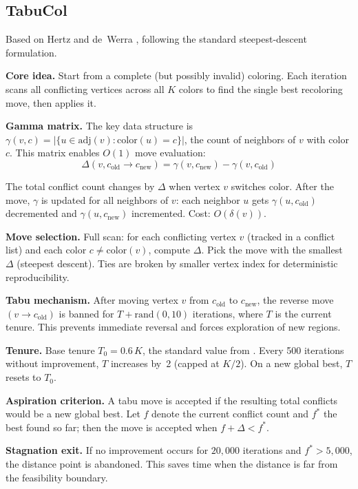 \documentclass[11pt,a4paper]{article}
\begin{document}
\subsection{TabuCol}

Based on Hertz and de~Werra \cite{hertz1987}, following the standard
steepest-descent formulation.

\textbf{Core idea.} Start from a complete (but possibly invalid) coloring. Each iteration
scans all conflicting vertices across all $K$ colors to find the single best recoloring
move, then applies it.

\textbf{Gamma matrix.} The key data structure is
$\gamma(v, c) = |\{u \in \text{adj}(v) : \text{color}(u) = c\}|$, the count of
neighbors of $v$ with color $c$. This matrix enables $O(1)$ move evaluation:
\[
  \Delta(v, c_{\text{old}} \to c_{\text{new}})
    = \gamma(v, c_{\text{new}}) - \gamma(v, c_{\text{old}})
\]

The total conflict count changes by $\Delta$ when vertex $v$ switches color. After the
move, $\gamma$ is updated for all neighbors of $v$: each neighbor $u$ gets
$\gamma(u, c_{\text{old}})$ decremented and $\gamma(u, c_{\text{new}})$ incremented.
Cost: $O(\delta(v))$.

\textbf{Move selection.} Full scan: for each conflicting vertex $v$ (tracked in a
conflict list) and each color $c \ne \text{color}(v)$, compute $\Delta$. Pick the move
with the smallest $\Delta$ (steepest descent). Ties are broken by smaller vertex index
for deterministic reproducibility.

\textbf{Tabu mechanism.} After moving vertex $v$ from $c_{\text{old}}$ to
$c_{\text{new}}$, the reverse move $(v \to c_{\text{old}})$ is banned for
$T + \text{rand}(0, 10)$ iterations, where $T$ is the current tenure. This prevents
immediate reversal and forces exploration of new regions.

\textbf{Tenure.} Base tenure $T_0 = 0.6\, K$, the standard value from
\cite{hertz1987}. Every 500 iterations without improvement,
$T$ increases by~2 (capped at $K/2$). On a new global best, $T$ resets to $T_0$.

\textbf{Aspiration criterion.} A tabu move is accepted if the resulting total conflicts
would be a new global best. Let $f$ denote the current conflict count and $f^*$ the best
found so far; then the move is accepted when $f + \Delta < f^*$.

\textbf{Stagnation exit.} If no improvement occurs for $20{,}000$ iterations and
$f^* > 5{,}000$, the distance point is abandoned. This saves time when the distance is
far from the feasibility boundary.
\end{document}
